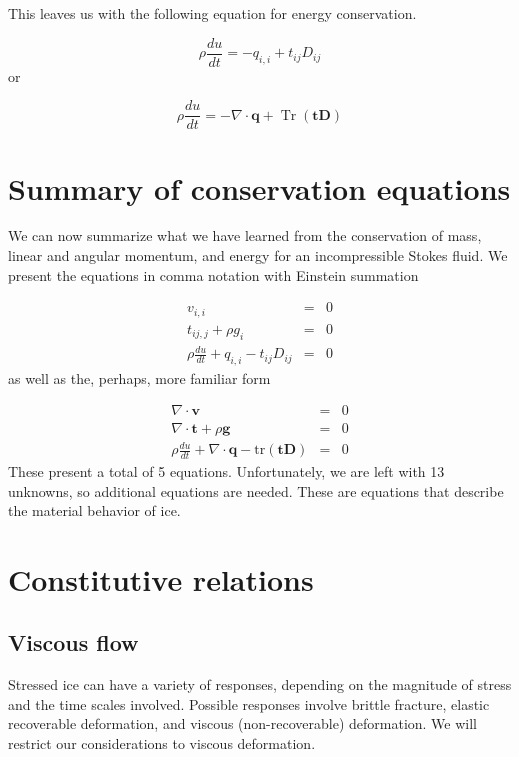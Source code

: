 \documentclass[12pt, openany]{memoir}
\DeclareMathOperator{\Tr}{Tr}
\begin{document}
This leaves us with the following equation for energy conservation. 

\begin{equation}
\rho \frac{du}{dt} = - q_{i,i} + t_{ij}D_{ij}
\end{equation}
or

\begin{equation}
\rho \frac{du}{dt} = - \nabla \cdot \mathbf{q} + \Tr (\mathbf{tD})
\end{equation}

\section{Summary of conservation equations}

We can now summarize what we have learned from the conservation of
mass, linear and angular momentum, and energy for an incompressible
Stokes fluid. We present the equations in comma notation with Einstein
summation

\begin{eqnarray}
v_{i,i} &=& 0 \\
t_{ij,j} + \rho g_i &=& 0 \\
\rho \frac{du}{dt} + q_{i,i} - t_{ij}D_{ij} &=& 0
\end{eqnarray}
as well as the, perhaps, more familiar form

\begin{eqnarray}
\nabla \cdot \mathbf{v} &=& 0 \\
\nabla \cdot \mathbf{t} + \rho \mathbf{g} &=& 0 \\
\rho \frac{du}{dt} + \nabla \cdot \mathbf{q} - \mathrm{tr}
(\mathbf{t}\mathbf{D})  &=& 0
\end{eqnarray}
These present a total of 5 equations. Unfortunately, we are left with
13 unknowns, so additional equations are needed. These are equations
that describe the material behavior of ice.

\section{Constitutive relations}

\subsection{Viscous flow}

Stressed ice can have a variety of responses, depending on the
magnitude of stress and the time scales involved. Possible responses
involve brittle fracture, elastic recoverable deformation, and viscous
(non-recoverable) deformation. We will restrict our considerations to
viscous deformation.
\end{document}
